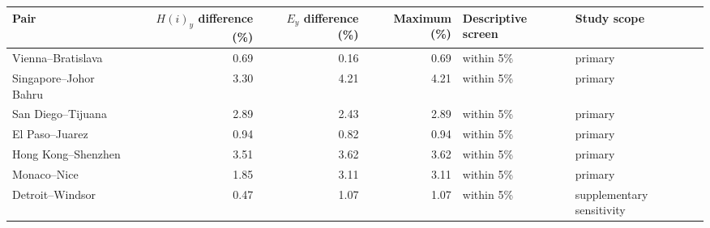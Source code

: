 \begin{tabular}{@{}lrrrll@{}}
\toprule
Pair & $H(i)_y$ difference (\%) & $E_y$ difference (\%) & Maximum (\%) & Descriptive screen & Study scope \\
\midrule
Vienna--Bratislava & 0.69 & 0.16 & 0.69 & within 5\% & primary \\
Singapore--Johor Bahru & 3.30 & 4.21 & 4.21 & within 5\% & primary \\
San Diego--Tijuana & 2.89 & 2.43 & 2.89 & within 5\% & primary \\
El Paso--Juarez & 0.94 & 0.82 & 0.94 & within 5\% & primary \\
Hong Kong--Shenzhen & 3.51 & 3.62 & 3.62 & within 5\% & primary \\
Monaco--Nice & 1.85 & 3.11 & 3.11 & within 5\% & primary \\
Detroit--Windsor & 0.47 & 1.07 & 1.07 & within 5\% & supplementary sensitivity \\
\bottomrule
\end{tabular}
